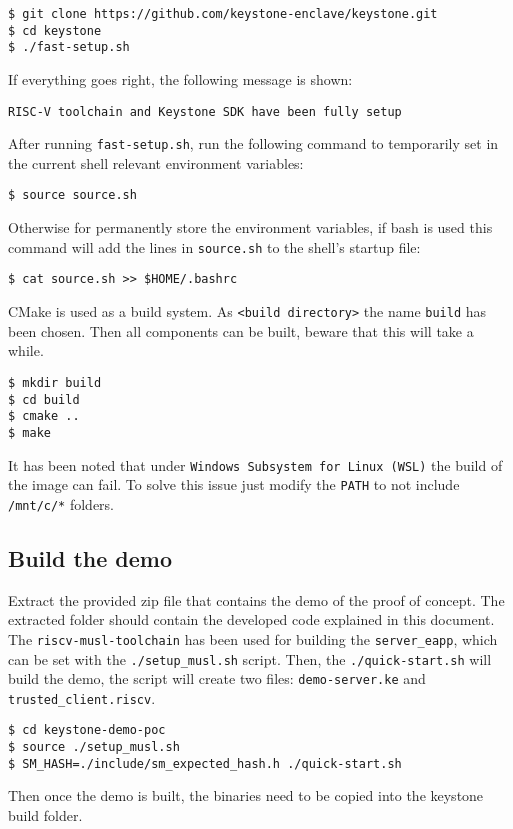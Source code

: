 \begin{lstlisting}[frame=single]
$ git clone https://github.com/keystone-enclave/keystone.git
$ cd keystone
$ ./fast-setup.sh
\end{lstlisting}
If everything goes right, the following message is shown: 

\begin{lstlisting}[frame=single]
    RISC-V toolchain and Keystone SDK have been fully setup
\end{lstlisting}
After running \texttt{fast-setup.sh}, run the following command to temporarily set in the current shell relevant environment variables: 
\begin{lstlisting}[frame=single]
$ source source.sh
\end{lstlisting}
Otherwise for permanently store the environment variables, if bash is used this command will add the lines in \texttt{source.sh} to the shell's startup file: 
\begin{lstlisting}[frame=single]
$ cat source.sh >> $HOME/.bashrc
\end{lstlisting}
CMake \cite{cmake} is used as a build system. As \texttt{<build directory>} the name \texttt{build} has been chosen. Then all components can be built, beware that this will take a while. 
\begin{lstlisting}[frame=single]
$ mkdir build
$ cd build
$ cmake ..
$ make
\end{lstlisting}
\begin{mybox}
\faExclamation\enspace It has been noted that under \texttt{Windows Subsystem for Linux (WSL)} the build of the image can fail. To solve this issue just modify the \texttt{PATH} to not include \texttt{/mnt/c/*} folders.
\end{mybox}

\subsection{Build the demo}
Extract the provided zip file that contains the demo of the proof of concept. The extracted folder should contain the developed code explained in this document. The \texttt{riscv-musl-toolchain} has been used for building the \texttt{server\_eapp}, which can be set with the \texttt{./setup\_musl.sh} script. Then, the \texttt{./quick-start.sh} will build the demo, the script will create two files: \texttt{demo-server.ke} and \texttt{trusted\_client.riscv}. 
\begin{lstlisting}[frame=single]
$ cd keystone-demo-poc
$ source ./setup_musl.sh
$ SM_HASH=./include/sm_expected_hash.h ./quick-start.sh
\end{lstlisting}
Then once the demo is built, the binaries need to be copied into the keystone build folder.

